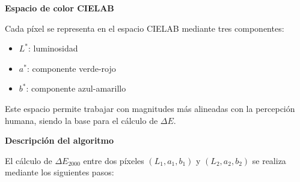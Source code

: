 \documentclass[a4paper]{article}
\begin{document}
\medskip
\textbf{Espacio de color CIELAB}

Cada píxel se representa en el espacio CIELAB mediante tres componentes:

\begin{itemize}
	\item $L^*$: luminosidad
	\item $a^*$: componente verde-rojo
	\item $b^*$: componente azul-amarillo
\end{itemize}

Este espacio permite trabajar con magnitudes más alineadas con la percepción humana, siendo la base para el cálculo de $\Delta E$.

\medskip
\textbf{Descripción del algoritmo}

El cálculo de $\Delta E_{2000}$ entre dos píxeles $(L_1, a_1, b_1)$ y $(L_2, a_2, b_2)$ se realiza mediante los siguientes pasos:
\end{document}
